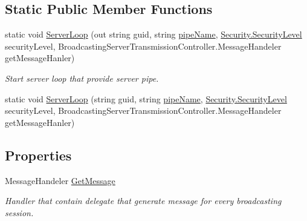 \subsection*{Static Public Member Functions}
\begin{DoxyCompactItemize}
\item 
static void \mbox{\hyperlink{class_pipes_provider_1_1_server_1_1_transmission_controllers_1_1_broadcasting_server_transmission_controller_aaa65501bc7934c782714b35247475c6d}{Server\+Loop}} (out string guid, string \mbox{\hyperlink{class_pipes_provider_1_1_server_1_1_transmission_controllers_1_1_base_server_transmission_controller_a4ce9911f1ad6814d3e5c9096d9ddde57}{pipe\+Name}}, \mbox{\hyperlink{namespace_pipes_provider_1_1_security_a1a6020eca1c661a6f7140e8260502d7e}{Security.\+Security\+Level}} security\+Level, Broadcasting\+Server\+Transmission\+Controller.\+Message\+Handeler get\+Message\+Hanler)
\begin{DoxyCompactList}\small\item\em Start server loop that provide server pipe. \end{DoxyCompactList}\item 
static void \mbox{\hyperlink{class_pipes_provider_1_1_server_1_1_transmission_controllers_1_1_broadcasting_server_transmission_controller_a6abf38daa4d961cfee0e2551648afe37}{Server\+Loop}} (string guid, string \mbox{\hyperlink{class_pipes_provider_1_1_server_1_1_transmission_controllers_1_1_base_server_transmission_controller_a4ce9911f1ad6814d3e5c9096d9ddde57}{pipe\+Name}}, \mbox{\hyperlink{namespace_pipes_provider_1_1_security_a1a6020eca1c661a6f7140e8260502d7e}{Security.\+Security\+Level}} security\+Level, Broadcasting\+Server\+Transmission\+Controller.\+Message\+Handeler get\+Message\+Hanler)
\end{DoxyCompactItemize}
\subsection*{Properties}
\begin{DoxyCompactItemize}
\item 
Message\+Handeler \mbox{\hyperlink{class_pipes_provider_1_1_server_1_1_transmission_controllers_1_1_broadcasting_server_transmission_controller_a1e4cce8f6139f3e325ef8b1bbae350e9}{Get\+Message}}
\begin{DoxyCompactList}\small\item\em Handler that contain delegate that generate message for every broadcasting session. \end{DoxyCompactList}\end{DoxyCompactItemize}
